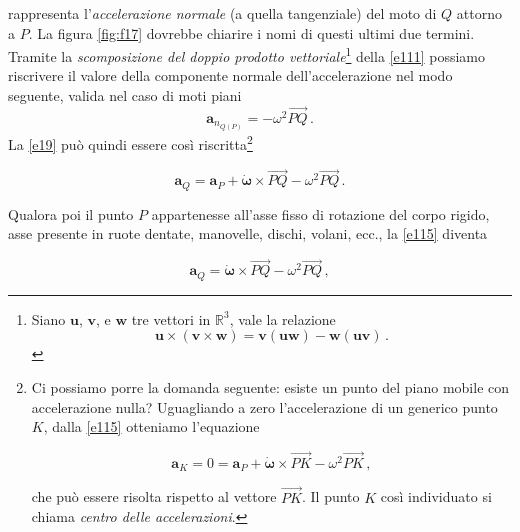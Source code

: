 \noindent  rappresenta l'{\em accelerazione normale}
(a quella tangenziale)
del moto di $Q$ attorno a $P$.
La figura \ref{fig:f17}
dovrebbe chiarire i nomi di questi ultimi due termini.
Tramite la {\em scomposizione del doppio prodotto vettoriale}\footnote{\label{fig:foot110}
Siano ${\bm u}$, ${\bm v}$, e ${\bm w}$ tre 
vettori in $\mathbb{R}^3$, vale la relazione
\begin{equation}
{\bm u}\times({\bm v}\times{\bm w})=
{\bm v}({\bm u}{\bm w})-
{\bm w}({\bm u}{\bm v})\,.
\label{e2f}
\end{equation}
} 
della \ref{e111} possiamo riscrivere il valore della componente 
normale dell'accelerazione nel modo seguente,
valida nel caso di moti piani
\begin{equation}
{\bm a}_{\scriptscriptstyle{{n}_{Q(P)}}}= -\omega^2 {{\overrightarrow{PQ}}}\,.
\label{e112}
\end{equation}
\noindent La \ref{e19} pu\`o quindi essere
cos\`i riscritta\footnote
{
Ci possiamo
porre la domanda seguente: esiste un punto del piano mobile
con accelerazione nulla?
Uguagliando a zero l'accelerazione
di un generico punto $K$,
dalla \ref{e115}
otteniamo l'equazione

\begin{equation}
{{\bm a}_{\scriptscriptstyle{K}}} = 0 =
{{\bm a}_{\scriptscriptstyle{P}}} +
\dot{\bm \omega} \times \overrightarrow{PK}-
\omega^2 {{\overrightarrow{PK}}}\,,
\label{e1f}
\end{equation}

\noindent che pu\`o essere risolta rispetto al vettore $\overrightarrow{PK}$.
Il punto $K$ cos\`i individuato si chiama {\em centro delle accelerazioni}.
}

\begin{equation}
{{\bm a}_{\scriptscriptstyle{Q}}} =
{{\bm a}_{\scriptscriptstyle{P}}} +
\dot{\bm \omega} \times \overrightarrow{PQ}-
\omega^2 {{\overrightarrow{PQ}}}\,.
	\label{e115}
\end{equation}

\noindent Qualora poi il punto $P$ appartenesse all'asse fisso di rotazione del corpo rigido, 
asse presente in ruote dentate, manovelle,
dischi, volani, ecc.,
la \ref{e115} diventa

\begin{equation}
{{\bm a}_{\scriptscriptstyle{Q}}} =
\dot{\bm \omega} \times \overrightarrow{PQ}-
\omega^2 {{\overrightarrow{PQ}}}\,,
	\label{e116}
\end{equation}

